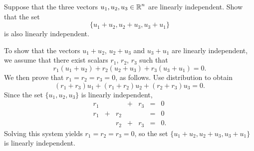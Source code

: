 \documentclass{ximera}
\begin{document}
\begin{exercise} \label{c5.4.7}
Suppose that the three vectors $u_1,u_2,u_3\in\mbox{$\Bbb{R}$}^n$ are linearly
independent.  Show that the set
\[
\{u_1+u_2, u_2+u_3,u_3+u_1\}
\]
is also linearly independent.

\begin{solution}

To show that the vectors $u_1 + u_2$, $u_2 + u_3$ and $u_3 + u_1$
are linearly independent, we assume that there exist scalars $r_1$,
$r_2$, $r_3$ such that
\[ r_1(u_1 + u_2) + r_2(u_2 + u_3) + r_3(u_3 + u_1) = 0. \]
We then prove that $r_1 = r_2 = r_3 = 0$, as follows.
Use distribution to obtain
\[ (r_1 + r_3)u_1 + (r_1 + r_2)u_2 + (r_2 + r_3)u_3 = 0. \]
Since the set $\{u_1,u_2,u_3\}$ is linearly independent,
\[ \begin{array}{rrrrrcl}
r_1 & & & + & r_3 & = & 0 \\
r_1 & + & r_2 & & & = & 0 \\
& & r_2 & + & r_3 & = & 0. \end{array} \]
Solving this system yields $r_1 = r_2 = r_3 = 0$,
so the set $\{u_1 + u_2,u_2 + u_3,u_3 + u_1\}$ is linearly
independent.

\end{solution}
\end{exercise}
\end{document}
